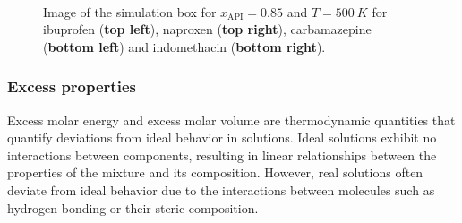 \begin{figure}[htb!]
	\centering
	\hspace{0.2cm}
	\\
	\vspace{0.2cm}
	\hspace{0.2cm}
	\caption{Image of the simulation box for $x_{\text{API}}=0.85$ and $T=500~K$ for ibuprofen (\textbf{top left}), naproxen (\textbf{top right}), carbamazepine (\textbf{bottom left}) and indomethacin (\textbf{bottom right}).}
	\label{fig:mix_boxes}
\end{figure}

\newpage
\subsubsection{Excess properties}
Excess molar energy and excess molar volume are thermodynamic quantities that quantify deviations from ideal behavior in solutions. Ideal solutions exhibit no interactions between components, resulting in linear relationships between the properties of the mixture and its composition. However, real solutions often deviate from ideal behavior due to the interactions between molecules such as hydrogen bonding or their steric composition.


